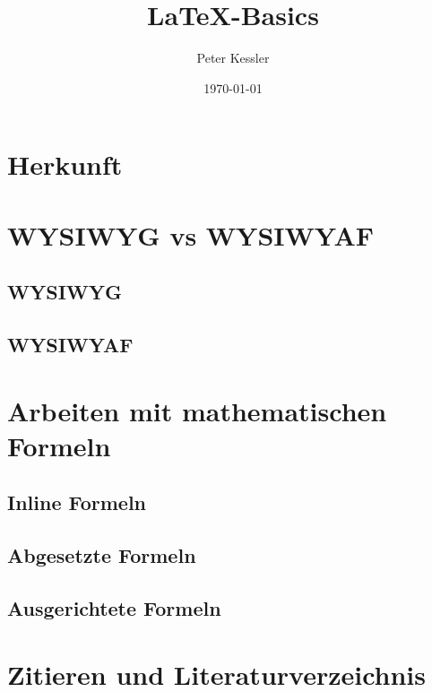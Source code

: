 \documentclass[12pt, a4paper, parskip=full]{scrartcl}
\title{\LaTeX-Basics}         %
\author{Peter Kessler}        %
\date{\today}                 %
\begin{document}
\maketitle
\thispagestyle{empty}   


\pagebreak
\tableofcontents


\pagebreak 
\section{Herkunft}



\pagebreak
\section{WYSIWYG vs WYSIWYAF}

\subsection{WYSIWYG}


\subsection{WYSIWYAF}


\pagebreak
\section{Arbeiten mit mathematischen Formeln}


\subsection{Inline Formeln}


\subsection{Abgesetzte Formeln}


\subsection{Ausgerichtete Formeln}


\pagebreak
\section{Zitieren und Literaturverzeichnis}


\pagebreak


\printbibliography[title={Literatur- \& Quellenverzeichnis}]        
\end{document}
